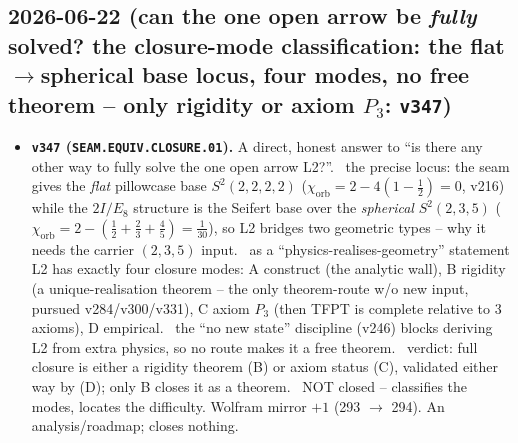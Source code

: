 \subsection*{2026-06-22 (can the one open arrow be \emph{fully} solved? the closure-mode classification: the flat$\to$spherical base locus, four modes, no free theorem -- only rigidity or axiom $P_3$: \texttt{v347})}
\begin{itemize}
\item \textbf{\texttt{v347} (\texttt{SEAM.EQUIV.CLOSURE.01}).} A direct, honest answer to ``is there any other way
to fully solve the one open arrow L2?''. \mE\ the precise locus: the seam gives the \emph{flat} pillowcase base
$S^2(2,2,2,2)$ ($\chi_{\mathrm{orb}}=2-4(1-\tfrac12)=0$, v216) while the $2I/E_8$ structure is the Seifert base over
the \emph{spherical} $S^2(2,3,5)$ ($\chi_{\mathrm{orb}}=2-(\tfrac12+\tfrac23+\tfrac45)=\tfrac1{30}$), so L2 bridges
two geometric types -- why it needs the carrier $(2,3,5)$ input. \mE\ as a ``physics-realises-geometry'' statement
L2 has exactly four closure modes: A construct (the analytic wall), B rigidity (a unique-realisation theorem --
the only theorem-route w/o new input, pursued v284/v300/v331), C axiom $P_3$ (then TFPT is complete relative to 3
axioms), D empirical. \mE\ the ``no new state'' discipline (v246) blocks deriving L2 from extra physics, so no route
makes it a free theorem. \mE\ verdict: full closure is either a rigidity theorem (B) or axiom status (C), validated
either way by (D); only B closes it as a theorem. \mO\ NOT closed -- classifies the modes, locates the difficulty.
Wolfram mirror $+1$ (293 $\to$ 294). An analysis/roadmap; closes nothing.
\end{itemize}

